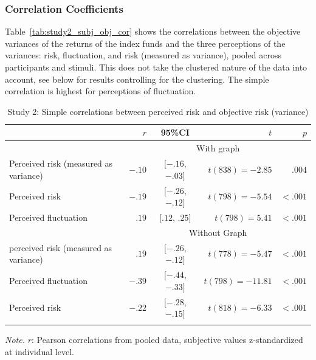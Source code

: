 \subsubsection{Correlation Coefficients}
\label{study2_subj_obj_cor}
Table~\ref{tab:study2_subj_obj_cor} shows the correlations between the objective variances of the returns of the index funds and the three perceptions of the variances: risk, fluctuation, and risk (measured as variance), pooled across participants and stimuli. This does not take the clustered nature of the data into account, see below for results controlling for the clustering. The simple correlation is highest for perceptions of fluctuation.
%
\begin{table}[H]
\begin{center}
\begin{threeparttable}
\caption{Study 2: Simple correlations between perceived risk and objective risk (variance)}
\begin{tabular}{lrcrr}
\toprule
  & $r$ & 95\%CI & $t$ & $p$\\
 \midrule
& \multicolumn{4}{c}{With graph}\\
\cmidrule{2-5}
 Perceived risk (measured as variance) & $-.10$ & $[-.16$, $-.03]$ & $t(838) = -2.85$ & $.004$\\
 Perceived risk & $-.19$& $[-.26$, $-.12]$ & $t(798) = -5.54$& $<.001$\\
 Perceived fluctuation & $.19$ & $[.12$, $.25]$ & $t(798) = 5.41$& $<.001$\\
\midrule
 & \multicolumn{4}{c}{Without Graph}\\
 \cmidrule{2-5}
 perceived risk (measured as variance) & $.19$ & $[-.26$, $-.12]$ & $t(778) = -5.47$& $ <.001$\\
 Perceived fluctuation & $-.39$ & $[-.44$, $-.33]$ & $t(798) = -11.81$& $ <.001$\\
 Perceived risk & $-.22$ & $[-.28$, $-.15]$ & $t(818) = -6.33$&  $ <.001$\\
\bottomrule
\addlinespace
\end{tabular}
\begin{tablenotes}[para]
\normalsize{\textit{Note.} $r$: Pearson correlations from pooled data, subjective values z-standardized at individual level.}
\end{tablenotes}
\end{threeparttable}
\end{center}
\end{table}


